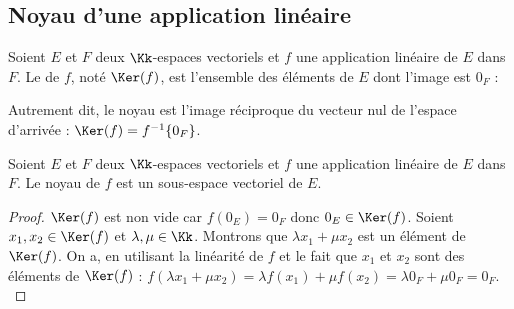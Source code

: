 \documentclass[class=report,crop=false]{standalone}
\begin{document}
\subsection{Noyau d'une application linéaire}


\begin{definition}
Soient $E$ et $F$ deux $\Kk$-espaces vectoriels et $f$ une application linéaire de $E$ dans $F$.
Le  de $f$, noté  $\Ker(f)$, est l'ensemble des
éléments de $E$ dont l'image est $0_{F}$ :

 Autrement dit, le noyau est l'image réciproque du vecteur nul de l'espace d'arrivée :
 $\Ker(f) = f^{-1} \{0_F\}$.
 \end{definition}



\begin{proposition}
Soient $E$ et $F$ deux $\Kk$-espaces vectoriels et $f$ une application linéaire de $E$ dans $F$.
Le noyau de $f$ est un sous-espace vectoriel de $E$.
\end{proposition}

\begin{proof}
$\Ker(f)$ est non vide car $f(0_E)=0_F$ donc $0_{E} \in \Ker (f)$. Soient $x_1,x_2 \in \Ker (f)$
et $\lambda,\mu \in \Kk$. Montrons que
$\lambda x_1+\mu x_2$ est un élément de $\Ker (f)$.
On a, en utilisant la linéarité de $f$ et le fait que
$x_1$ et $x_2$ sont des éléments de $\Ker (f)$ :
$f(\lambda x_1+\mu x_2)=\lambda f(x_1)+\mu f(x_2)= \lambda 0_{F} + \mu 0_{F}=0_{F}.$
\end{proof}
\end{document}
